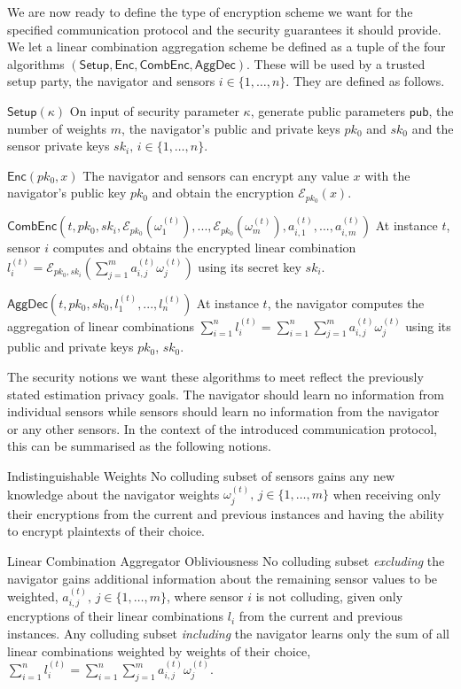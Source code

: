 \documentclass[10pt,letterpaper,oneside,twocolumn,journal]{IEEEtran}
\theoremstyle{definition}
\theoremstyle{definition}
\theoremstyle{remark}
\newcommand\shrtdots{\!...}
\begin{document}
We are now ready to define the type of encryption scheme we want for the specified communication protocol and the security guarantees it should provide. We let a linear combination aggregation scheme be defined as a tuple of the four algorithms $(\mathsf{Setup}, \mathsf{Enc}, \mathsf{CombEnc}, \mathsf{AggDec})$. These will be used by a trusted setup party, the navigator and sensors $i\in\{1,\dots,n\}$. They are defined as follows.
\begin{LaTeXdescription}
    \item[$\mathsf{Setup}(\kappa)$] On input of security parameter $\kappa$, generate public parameters $\mathsf{pub}$, the number of weights $m$, the navigator's public and private keys $pk_0$ and $sk_0$ and the sensor private keys $sk_i,\,i\in\{1,\dots,n\}$.
    \item[$\mathsf{Enc}(pk_0, x)$] The navigator and sensors can encrypt any value $x$ with the navigator's public key $pk_0$ and obtain the encryption $\mathcal{E}_{pk_0}(x)$.
    \item[$\mathsf{CombEnc}(t, pk_0, sk_i, \mathcal{E}_{pk_0}(\omega_1^{(t)}),\shrtdots,\mathcal{E}_{pk_0}(\omega_m^{(t)}), a^{(t)}_{i,1},\shrtdots,a^{(t)}_{i,m})$] At instance $t$, sensor $i$ computes and obtains the encrypted linear combination $l^{(t)}_i = \mathcal{E}_{pk_0,sk_i}(\sum^m_{j=1}a^{(t)}_{i,j}\omega^{(t)}_j)$ using its secret key $sk_i$.
    \item[$\mathsf{AggDec}(t, pk_0, sk_0, l^{(t)}_1,\shrtdots,l^{(t)}_n)$] At instance $t$, the navigator computes the aggregation of linear combinations $\sum^{n}_{i=1}l_i^{(t)}=\sum^{n}_{i=1}\sum^{m}_{j=1} a^{(t)}_{i,j}\omega^{(t)}_j$ using its public and private keys $pk_0$, $sk_0$.
\end{LaTeXdescription}
The security notions we want these algorithms to meet reflect the previously stated estimation privacy goals. The navigator should learn no information from individual sensors while sensors should learn no information from the navigator or any other sensors. In the context of the introduced communication protocol, this can be summarised as the following notions.
\begin{LaTeXdescription}
    \item[Indistinguishable Weights] No colluding subset of sensors gains any new knowledge about the navigator weights $\omega^{(t)}_j,\,j\in\{1,\dots,m\}$ when receiving only their encryptions from the current and previous instances and having the ability to encrypt plaintexts of their choice.
    \item[Linear Combination Aggregator Obliviousness] No colluding subset \textit{excluding} the navigator gains additional information about the remaining sensor values to be weighted, $a^{(t)}_{i,j},\,j\in\{1,\dots,m\}$, where sensor $i$ is not colluding, given only encryptions of their linear combinations $l_i$ from the current and previous instances. Any colluding subset \textit{including} the navigator learns only the sum of all linear combinations weighted by weights of their choice, $\sum^{n}_{i=1}l_i^{(t)}=\sum^{n}_{i=1}\sum^{m}_{j=1} a^{(t)}_{i,j}\omega^{(t)}_j$.
\end{LaTeXdescription}
\end{document}
